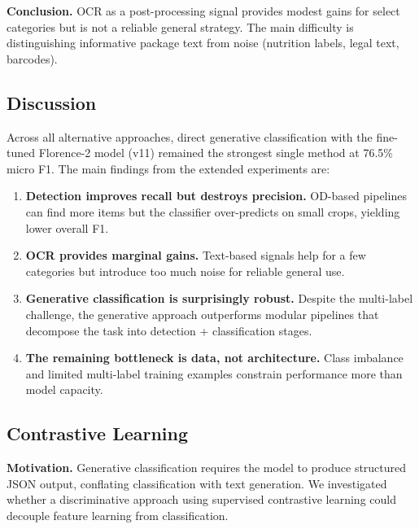 \textbf{Conclusion.} OCR as a post-processing signal provides modest gains for select categories but is not a reliable general strategy. The main difficulty is distinguishing informative package text from noise (nutrition labels, legal text, barcodes).

\subsection{Discussion}

Across all alternative approaches, direct generative classification with the fine-tuned Florence-2 model (v11) remained the strongest single method at 76.5\% micro F1. The main findings from the extended experiments are:

\begin{enumerate}[nosep,leftmargin=1.5em]
  \item \textbf{Detection improves recall but destroys precision.} OD-based pipelines can find more items but the classifier over-predicts on small crops, yielding lower overall F1.
  \item \textbf{OCR provides marginal gains.} Text-based signals help for a few categories but introduce too much noise for reliable general use.
  \item \textbf{Generative classification is surprisingly robust.} Despite the multi-label challenge, the generative approach outperforms modular pipelines that decompose the task into detection + classification stages.
  \item \textbf{The remaining bottleneck is data, not architecture.} Class imbalance and limited multi-label training examples constrain performance more than model capacity.
\end{enumerate}

\subsection{Contrastive Learning}
\label{ssec:contrastive}

\textbf{Motivation.} Generative classification requires the model to produce structured JSON output, conflating classification with text generation. We investigated whether a discriminative approach using supervised contrastive learning could decouple feature learning from classification.

